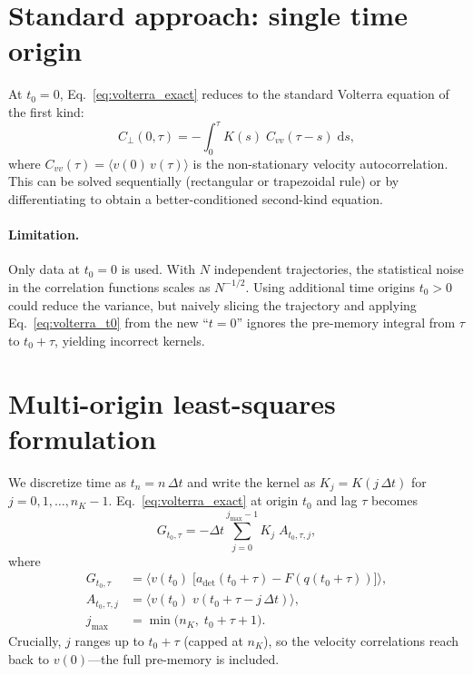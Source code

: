 \documentclass[11pt]{article}
\newcommand{\avg}[1]{\langle #1 \rangle}
\newcommand{\dd}{\mathrm{d}}
\newcommand{\dt}{\Delta t}
\begin{document}
\section{Standard approach: single time origin}

At $t_0 = 0$, Eq.~\eqref{eq:volterra_exact} reduces to the standard
Volterra equation of the first kind:
\begin{equation}\label{eq:volterra_t0}
  C_{\perp}(0,\tau)
  = -\int_0^{\tau} K(s)\;C_{vv}(\tau-s)\;\dd s,
\end{equation}
where $C_{vv}(\tau) = \avg{v(0)\,v(\tau)}$ is the non-stationary velocity
autocorrelation.  This can be solved sequentially (rectangular or trapezoidal
rule) or by differentiating to obtain a better-conditioned second-kind equation.

\paragraph{Limitation.}
Only data at $t_0 = 0$ is used.  With $N$ independent trajectories,
the statistical noise in the correlation functions scales as $N^{-1/2}$.
Using additional time origins $t_0 > 0$ could reduce the variance, but
naively slicing the trajectory and applying Eq.~\eqref{eq:volterra_t0}
from the new ``$t=0$'' ignores the pre-memory integral from $\tau$ to
$t_0+\tau$, yielding incorrect kernels.

\section{Multi-origin least-squares formulation}

We discretize time as $t_n = n\,\dt$ and write the kernel as
$K_j = K(j\,\dt)$ for $j = 0, 1, \ldots, n_K - 1$.
Eq.~\eqref{eq:volterra_exact} at origin $t_0$ and lag $\tau$ becomes
\begin{equation}\label{eq:discrete}
  G_{t_0,\tau}
  = -\dt \sum_{j=0}^{j_{\max}-1} K_j \; A_{t_0,\tau,j},
\end{equation}
where
\begin{align}
  G_{t_0,\tau}
    &= \avg{v(t_0)\;\bigl[a_{\mathrm{det}}(t_0{+}\tau) - F(q(t_0{+}\tau))\bigr]},
    \label{eq:G}\\[4pt]
  A_{t_0,\tau,j}
    &= \avg{v(t_0)\;v(t_0{+}\tau{-}j\,\dt)},
    \label{eq:A}\\[4pt]
  j_{\max}
    &= \min\!\bigl(n_K,\; t_0{+}\tau{+}1\bigr).
    \label{eq:jmax}
\end{align}
Crucially, $j$ ranges up to $t_0 + \tau$ (capped at $n_K$), so the velocity
correlations reach back to $v(0)$---the full pre-memory is included.
\end{document}
